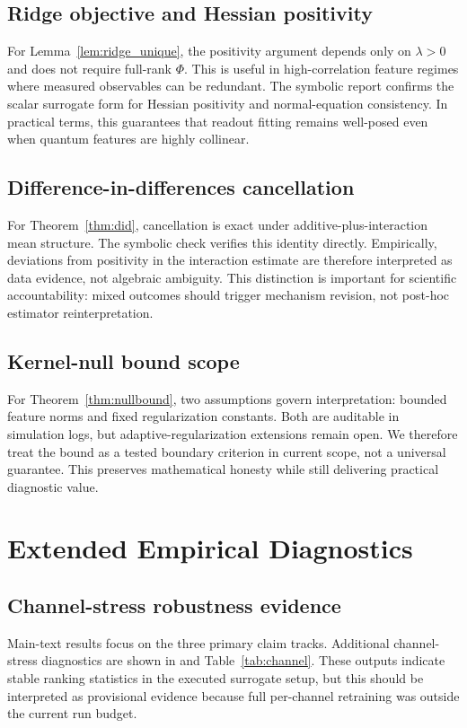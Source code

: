 \documentclass{article} %
\begin{document}
\subsection{Ridge objective and Hessian positivity}
For Lemma~\ref{lem:ridge_unique}, the positivity argument depends only on $\lambda>0$ and does not require full-rank $\Phi$. This is useful in high-correlation feature regimes where measured observables can be redundant. The symbolic report confirms the scalar surrogate form for Hessian positivity and normal-equation consistency. In practical terms, this guarantees that readout fitting remains well-posed even when quantum features are highly collinear.

\subsection{Difference-in-differences cancellation}
For Theorem~\ref{thm:did}, cancellation is exact under additive-plus-interaction mean structure. The symbolic check verifies this identity directly. Empirically, deviations from positivity in the interaction estimate are therefore interpreted as data evidence, not algebraic ambiguity. This distinction is important for scientific accountability: mixed outcomes should trigger mechanism revision, not post-hoc estimator reinterpretation.

\subsection{Kernel-null bound scope}
For Theorem~\ref{thm:nullbound}, two assumptions govern interpretation: bounded feature norms and fixed regularization constants. Both are auditable in simulation logs, but adaptive-regularization extensions remain open. We therefore treat the bound as a tested boundary criterion in current scope, not a universal guarantee. This preserves mathematical honesty while still delivering practical diagnostic value.

\section{Extended Empirical Diagnostics}\label{app:extended_results}
\subsection{Channel-stress robustness evidence}
Main-text results focus on the three primary claim tracks. Additional channel-stress diagnostics are shown in  and Table~\ref{tab:channel}. These outputs indicate stable ranking statistics in the executed surrogate setup, but this should be interpreted as provisional evidence because full per-channel retraining was outside the current run budget.
\end{document}
